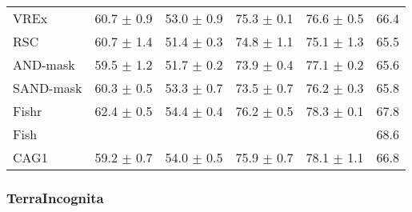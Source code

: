 \documentclass{article}
\begin{document}
\begin{center}
{\begin{tabular}{lccccc}
VREx                 & 60.7 $\pm$ 0.9       & 53.0 $\pm$ 0.9       & 75.3 $\pm$ 0.1       & 76.6 $\pm$ 0.5       & 66.4                 \\
RSC                  & 60.7 $\pm$ 1.4       & 51.4 $\pm$ 0.3       & 74.8 $\pm$ 1.1       & 75.1 $\pm$ 1.3       & 65.5                 \\
AND-mask             & 59.5 $\pm$ 1.2       & 51.7 $\pm$ 0.2       & 73.9 $\pm$ 0.4       & 77.1 $\pm$ 0.2       & 65.6                 \\
SAND-mask            & 60.3 $\pm$ 0.5       & 53.3 $\pm$ 0.7       & 73.5 $\pm$ 0.7       & 76.2 $\pm$ 0.3       & 65.8                 \\
Fishr                & 62.4 $\pm$ 0.5       & 54.4 $\pm$ 0.4       & 76.2 $\pm$ 0.5       & 78.3 $\pm$ 0.1       & 67.8                 \\
Fish                 &                      &                      &                      &                      & 68.6                 \\
\midrule
CAG1                 & 59.2 $\pm$ 0.7       & 54.0 $\pm$ 0.5       & 75.9 $\pm$ 0.7       & 78.1 $\pm$ 1.1       & 66.8                 \\
\bottomrule
\end{tabular}}
\end{center}

\subsubsection{TerraIncognita}
\end{document}
